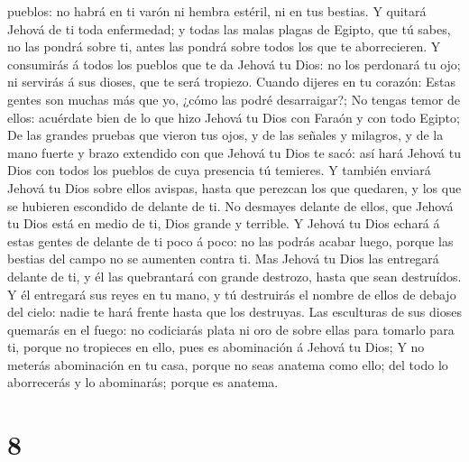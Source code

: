 pueblos: no habrá en ti varón ni hembra estéril, ni en tus bestias.
 Y quitará Jehová de ti toda enfermedad; y todas las
malas plagas de Egipto, que tú sabes, no las pondrá sobre ti, antes las
pondrá sobre todos los que te aborrecieren.  Y consumirás
á todos los pueblos que te da Jehová tu Dios: no los perdonará tu ojo;
ni servirás á sus dioses, que te será tropiezo.  Cuando
dijeres en tu corazón: Estas gentes son muchas más que yo, ¿cómo las
podré desarraigar?;  No tengas temor de ellos: acuérdate
bien de lo que hizo Jehová tu Dios con Faraón y con todo Egipto;
 De las grandes pruebas que vieron tus ojos, y de las
señales y milagros, y de la mano fuerte y brazo extendido con que Jehová
tu Dios te sacó: así hará Jehová tu Dios con todos los pueblos de cuya
presencia tú temieres.  Y también enviará Jehová tu Dios
sobre ellos avispas, hasta que perezcan los que quedaren, y los que se
hubieren escondido de delante de ti.  No desmayes delante
de ellos, que Jehová tu Dios está en medio de ti, Dios grande y
terrible.  Y Jehová tu Dios echará á estas gentes de
delante de ti poco á poco: no las podrás acabar luego, porque las
bestias del campo no se aumenten contra ti.  Mas Jehová
tu Dios las entregará delante de ti, y él las quebrantará con grande
destrozo, hasta que sean destruídos.  Y él entregará sus
reyes en tu mano, y tú destruirás el nombre de ellos de debajo del
cielo: nadie te hará frente hasta que los destruyas.  Las
esculturas de sus dioses quemarás en el fuego: no codiciarás plata ni
oro de sobre ellas para tomarlo para ti, porque no tropieces en ello,
pues es abominación á Jehová tu Dios;  Y no meterás
abominación en tu casa, porque no seas anatema como ello; del todo lo
aborrecerás y lo abominarás; porque es anatema.

\hypertarget{section-7}{%
\section{8}\label{section-7}}

